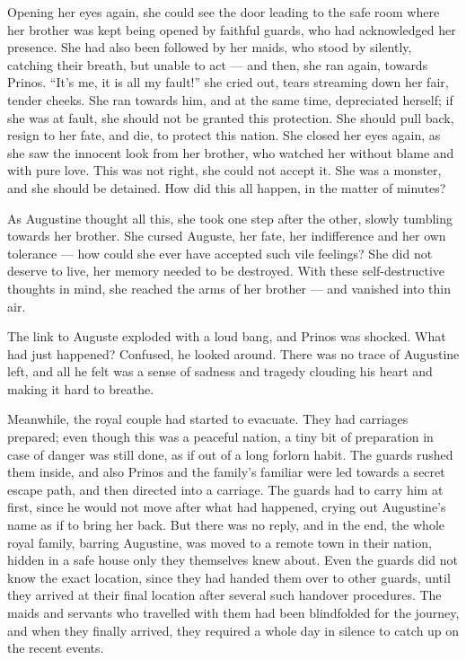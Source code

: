 Opening her eyes again, she could see the door leading to the safe room where her brother was kept being opened by faithful guards, who had acknowledged her presence. She had also been followed by her maids, who stood by silently, catching their breath, but unable to act --- and then, she ran again, towards Prinos. \enquote{It's me, it is all my fault!} she cried out, tears streaming down her fair, tender cheeks. She ran towards him, and at the same time, depreciated herself; if she was at fault, she should not be granted this protection. She should pull back, resign to her fate, and die, to protect this nation. She closed her eyes again, as she saw the innocent look from her brother, who watched her without blame and with pure love. This was not right, she could not accept it. She was a monster, and she should be detained. How did this all happen, in the matter of minutes?

As Augustine thought all this, she took one step after the other, slowly tumbling towards her brother. She cursed Auguste, her fate, her indifference and her own tolerance --- how could she ever have accepted such vile feelings? She did not deserve to live, her memory needed to be destroyed. With these self-destructive thoughts in mind, she reached the arms of her brother --- and vanished into thin air.

The link to Auguste exploded with a loud bang, and Prinos was shocked. What had just happened? Confused, he looked around. There was no trace of Augustine left, and all he felt was a sense of sadness and tragedy clouding his heart and making it hard to breathe.

Meanwhile, the royal couple had started to evacuate. They had carriages prepared; even though this was a peaceful nation, a tiny bit of preparation in case of danger was still done, as if out of a long forlorn habit. The guards rushed them inside, and also Prinos and the family's familiar were led towards a secret escape path, and then directed into a carriage. The guards had to carry him at first, since he would not move after what had happened, crying out Augustine's name as if to bring her back. But there was no reply, and in the end, the whole royal family, barring Augustine, was moved to a remote town in their nation, hidden in a safe house only they themselves knew about. Even the guards did not know the exact location, since they had handed them over to other guards, until they arrived at their final location after several such handover procedures. The maids and servants who travelled with them had been blindfolded for the journey, and when they finally arrived, they required a whole day in silence to catch up on the recent events.

